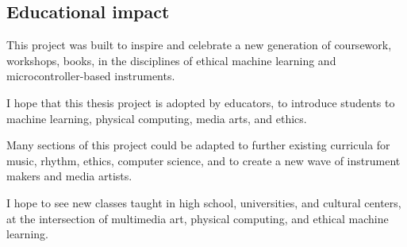 \subsection{Educational impact}

This project was built to inspire and celebrate a new generation of coursework, workshops, books, in the disciplines of ethical machine learning and microcontroller-based instruments.

I hope that this thesis project is adopted by educators, to introduce students to machine learning, physical computing, media arts, and ethics.

Many sections of this project could be adapted to further existing curricula for music, rhythm, ethics, computer science, and to create a new wave of instrument makers and media artists.

I hope to see new classes taught in high school, universities, and cultural centers, at the intersection of multimedia art, physical computing, and ethical machine learning.
